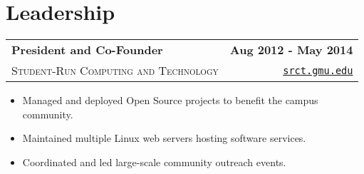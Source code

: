 \documentclass[letterpaper]{article}
\newenvironment{details}
{\begin{itemize}}
{\end{itemize}}
\begin{document}
%


  \section{Leadership}
  \noindent
  \begin{tabularx}{\textwidth}{@{}X r@{}}
    \textbf{President and Co-Founder} & \textbf{Aug 2012 - May 2014} \\
    \textsc{Student-Run Computing and Technology} & \texttt{\href{https://srct.gmu.edu}{srct.gmu.edu}}
  \end{tabularx}

  \begin{details}
  \item Managed and deployed Open Source projects to benefit the campus community.
  \item Maintained multiple Linux web servers hosting software services.
  \item Coordinated and led large-scale community outreach events.
  \end{details}


\end{document}
